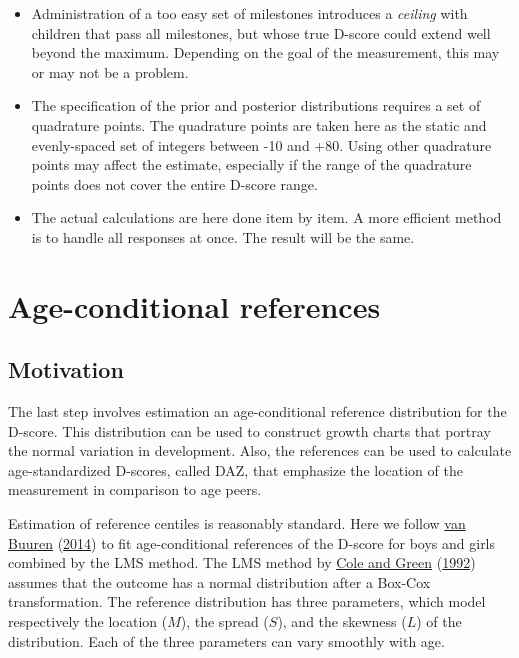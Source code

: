 \documentclass[
]{book}
\providecommand{\tightlist}{%
  \setlength{\itemsep}{0pt}\setlength{\parskip}{0pt}}
\begin{document}
\begin{itemize}
\tightlist
\item
  Administration of a too easy set of milestones introduces a \emph{ceiling} with children that pass all milestones, but whose true D-score could extend well beyond the maximum. Depending on the goal of the measurement, this may or may not be a problem.
\item
  The specification of the prior and posterior distributions requires a set of quadrature points. The quadrature points are taken here as the static and evenly-spaced set of integers between -10 and +80. Using other quadrature points may affect the estimate, especially if the range of the quadrature points does not cover the entire D-score range.
\item
  The actual calculations are here done item by item. A more efficient method is to handle all responses at once. The result will be the same.
\end{itemize}

\hypertarget{sec:reference}{%
\section{Age-conditional references}\label{sec:reference}}

\hypertarget{motivation}{%
\subsection{Motivation}\label{motivation}}

The last step involves estimation an age-conditional reference distribution for the D-score. This distribution can be used to construct growth charts that portray the normal variation in development. Also, the references can be used to calculate age-standardized D-scores, called DAZ, that emphasize the location of the measurement in comparison to age peers.

Estimation of reference centiles is reasonably standard. Here we follow \protect\hyperlink{ref-vanbuuren2014}{van Buuren} (\protect\hyperlink{ref-vanbuuren2014}{2014}) to fit age-conditional references of the D-score for boys and girls combined by the LMS method. The LMS method by \protect\hyperlink{ref-cole1992}{Cole and Green} (\protect\hyperlink{ref-cole1992}{1992}) assumes that the outcome has a normal distribution after a Box-Cox transformation. The reference distribution has three parameters, which model respectively the location (\(M\)), the spread (\(S\)), and the skewness (\(L\)) of the distribution. Each of the three parameters can vary smoothly with age.
\end{document}
